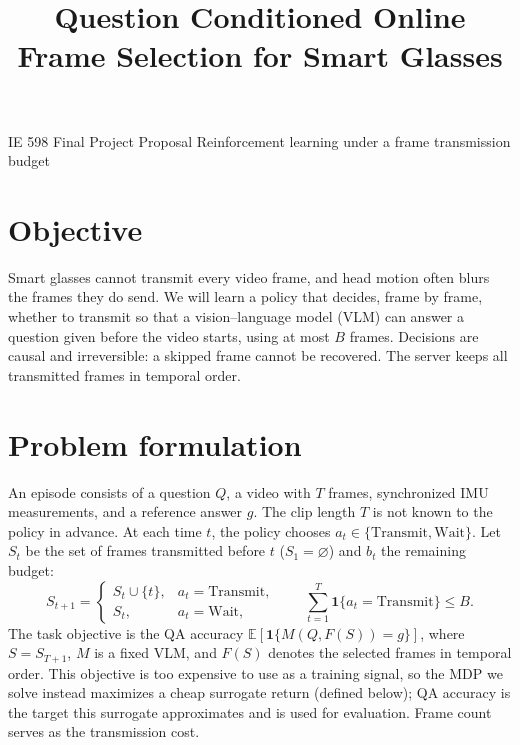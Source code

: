 \documentclass[
  11pt,
]{article}
\title{Question Conditioned Online Frame Selection for Smart Glasses}
\author{}
\date{}
\begin{document}
\maketitle

IE 598 Final Project Proposal \textbar{} Reinforcement learning under a
frame transmission budget

\section{Objective}

Smart glasses cannot transmit every video frame, and head motion often
blurs the frames they do send. We will learn a policy that decides, frame
by frame, whether to transmit so that a vision--language model (VLM) can
answer a question given before the video starts, using at most $B$
frames. Decisions are causal and irreversible: a skipped frame cannot be
recovered. The server keeps all transmitted frames in temporal order.

\section{Problem formulation}

An episode consists of a question $Q$, a video with $T$ frames,
synchronized IMU measurements, and a reference answer $g$. The clip
length $T$ is not known to the policy in advance. At each time
$t$, the policy chooses $a_t\in\{\mathrm{Transmit},\mathrm{Wait}\}$.
Let $S_t$ be the set of frames transmitted before $t$ ($S_1=\varnothing$)
and $b_t$ the remaining budget:
\[
S_{t+1}=\begin{cases}S_t\cup\{t\},&a_t=\mathrm{Transmit},\\S_t,&a_t=\mathrm{Wait},\end{cases}
\qquad
\sum_{t=1}^{T}\mathbf{1}\{a_t=\mathrm{Transmit}\}\le B .
\]
The task objective is the QA accuracy
$\mathbb{E}[\mathbf{1}\{M(Q,F(S))=g\}]$, where $S=S_{T+1}$, $M$ is a
fixed VLM, and $F(S)$ denotes the selected frames in temporal order.
This objective is too expensive to use as a training signal, so the
MDP we solve instead maximizes a cheap surrogate return (defined
below); QA accuracy is the target this surrogate approximates and
is used for evaluation. Frame count serves as the transmission cost.
\end{document}
